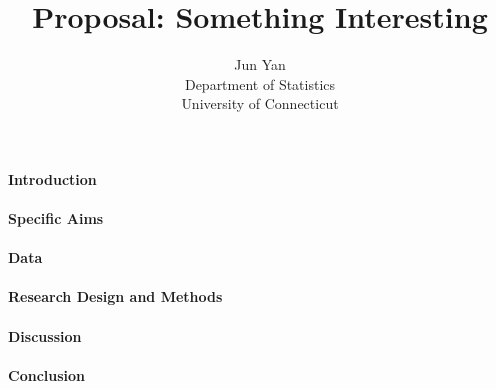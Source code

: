 \documentclass[12pt]{article}
\title{Proposal: Something Interesting}
\author{Jun Yan\\
  Department of Statistics\\
  University of Connecticut
}
\begin{document}
\maketitle


\paragraph{Introduction}
\lipsum[1] \citep{dwivedi2017analysis}

\paragraph{Specific Aims}
\lipsum[2]

\paragraph{Data}
\lipsum[3]

\paragraph{Research Design and Methods}
\lipsum[4]

\paragraph{Discussion}
\lipsum[5] \citep{wild2004global}

\paragraph{Conclusion}
\lipsum[1]




\end{document}
